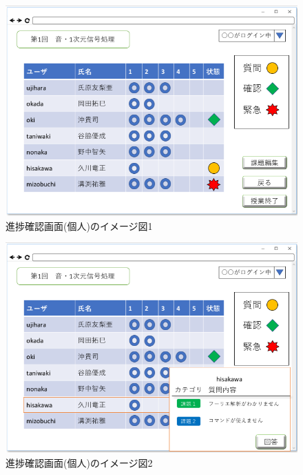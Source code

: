 \begin{figure}[phtbp]
  \begin{center}
    \includegraphics[width=0.9\linewidth,clip]{./img/22.png}
    \caption{進捗確認画面(個人)のイメージ図1}\label{fig:22}
  \end{center}
\end{figure}

\begin{figure}[phtbp]
  \begin{center}
    \includegraphics[width=0.9\linewidth,clip]{./img/23.png}
    \caption{進捗確認画面(個人)のイメージ図2}\label{fig:23}
  \end{center}
\end{figure}


